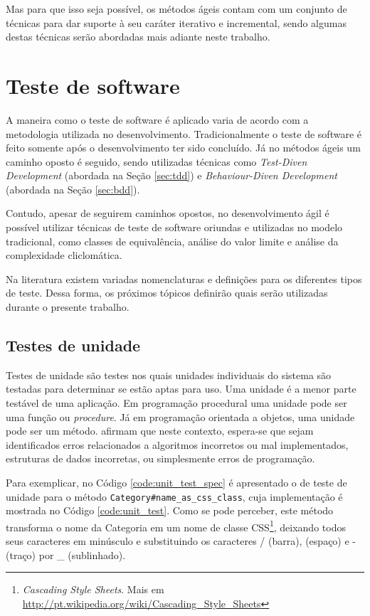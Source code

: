 Mas para que isso seja possível, os métodos ágeis contam com um conjunto de técnicas para dar suporte à seu caráter iterativo e incremental, sendo algumas destas técnicas serão abordadas mais adiante neste trabalho.



\section{Teste de software}
\label{sec:teste_de_software}


A maneira como o teste de software é aplicado varia de acordo com a metodologia utilizada no desenvolvimento. Tradicionalmente o teste de software é feito somente após o desenvolvimento ter sido concluído. Já no métodos ágeis um caminho oposto é seguido, sendo utilizadas técnicas como \textit{Test-Diven Development} (abordada na Seção \ref{sec:tdd}) e  \textit{Behaviour-Diven Development} (abordada na Seção \ref{sec:bdd}).

Contudo, apesar de seguirem caminhos opostos, no desenvolvimento ágil é possível utilizar técnicas de teste de software oriundas e utilizadas no modelo tradicional, como classes de equivalência, análise do valor limite e análise da complexidade cliclomática.

Na literatura existem variadas nomenclaturas e definições para os diferentes tipos de teste. Dessa forma, os próximos tópicos definirão quais serão utilizadas durante o presente trabalho.

\subsection{Testes de unidade}
\label{sub:testes_de_unidade}

Testes de unidade são testes nos quais unidades individuais do sistema são testadas para determinar se estão aptas para uso. Uma unidade é a menor parte testável de uma aplicação. Em programação procedural uma unidade pode ser uma função ou \textit{procedure}. Já em programação orientada a objetos, uma unidade pode ser um método.  afirmam que neste contexto, espera-se que sejam identificados erros relacionados a algoritmos incorretos ou mal implementados, estruturas de dados incorretas, ou simplesmente erros de programação.

Para exemplicar, no Código \ref{code:unit_test_spec} é apresentado o de teste de unidade para o método \texttt{Category\#name\_as\_css\_class}, cuja implementação é mostrada no Código \ref{code:unit_test}. Como se pode perceber, este método transforma o nome da Categoria em um nome de classe CSS\footnote{\textit{Cascading Style Sheets}. Mais em \url{http://pt.wikipedia.org/wiki/Cascading_Style_Sheets}}, deixando todos seus caracteres em minúsculo e substituindo os caracteres / (barra),  (espaço) e - (traço) por \_ (sublinhado).


